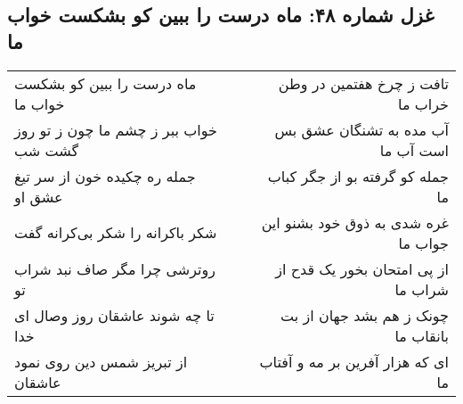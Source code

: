 \begin{center}
\section*{غزل شماره ۴۸: ماه درست را ببین کو بشکست خواب ما}
\label{sec:0048}
\begin{longtable}{l p{0.5cm} r}
ماه درست را ببین کو بشکست خواب ما
&&
تافت ز چرخ هفتمین در وطن خراب ما
\\
خواب ببر ز چشم ما چون ز تو روز گشت شب
&&
آب مده به تشنگان عشق بس است آب ما
\\
جمله ره چکیده خون از سر تیغ عشق او
&&
جمله کو گرفته بو از جگر کباب ما
\\
شکر باکرانه را شکر بی‌کرانه گفت
&&
غره شدی به ذوق خود بشنو این جواب ما
\\
روترشی چرا مگر صاف نبد شراب تو
&&
از پی امتحان بخور یک قدح از شراب ما
\\
تا چه شوند عاشقان روز وصال ای خدا
&&
چونک ز هم بشد جهان از بت بانقاب ما
\\
از تبریز شمس دین روی نمود عاشقان
&&
ای که هزار آفرین بر مه و آفتاب ما
\\
\end{longtable}
\end{center}

